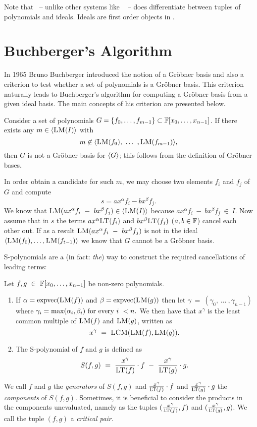 Note that \Sage\ -- unlike other systems like \Singular~\cite{singular} -- does differentiate between tuples of polynomials and ideals. Ideals are first order objects in \Sage.

\section{Buchberger's Algorithm}
In 1965 Bruno Buchberger introduced the notion of a Gröbner basis and also a criterion to test whether a set of polynomials is a Gröbner basis. This criterion naturally leads to Buchberger's algorithm for computing a Gröbner basis from a given ideal basis. The main concepts of his criterion are
presented below.

Consider a set of polynomials $G = \{f_0,\dots,f_{m-1}\} \subset \mathbb{F}[x_0,\dots,x_{n-1}]$. If there exists any $m \in \langle \textsc{LM}(I) \rangle$ with $$m \not\in \langle \textsc{LM}(f_0),\ \dots\ ,\textsc{LM}(f_{m-1})\rangle,$$ then $G$ is not a Gröbner basis for $\langle {G} \rangle$; this follows from the definition of Gröbner bases. 

In order obtain a candidate for such $m$, we may choose two elements $f_i$ and $f_j$ of $G$ and compute \[s = ax^\alpha f_i - bx^\beta f_j.\]
We know that $\textsc{LM}(ax^\alpha f_i\ -\ bx^\beta f_j) \in \langle\textsc{LM}(I)\rangle$ because $ax^\alpha f_i\ -\ bx^\beta f_j\ \in\ I$. Now assume that in $s$ the terms $ax^\alpha\textsc{LT}(f_i)$ and $bx^\beta\textsc{LT}(f_j)$ ($a,b \in \mathbb{F}$) cancel each other out. If as a result $\textsc{LM}(ax^\alpha f_i\ -\ bx^\beta f_j)$ is not in the ideal $\langle\textsc{LM}(f_0), \dots ,\textsc{LM}(f_{t-1})\rangle$ we know that $G$ cannot be a Gröbner basis. 


S-polynomials are a (in fact: \emph{the}) way to construct the required cancellations of leading terms:

\begin{definition}[S-Polynomial]
\hfill\par
\label{def:spolynomials}
Let $f,g\ \in\ \mathbb{F}[x_0,\dots,x_{n-1}]$ be non-zero polynomials.
\begin{enumerate}
\item If $\alpha =\textnormal{expvec}(\textsc{LM}(f))$ and $\beta = \textnormal{expvec}(\textsc{LM}(g))$ then let $\gamma\ =\ (\gamma_0,\ \dots\ ,\gamma_{n-1})$ where 
$\gamma_i = \max(\alpha_i,\beta_i) \textnormal{ for every } i\ < n.$ We then have that $x^\gamma$ is the least common multiple of
$\textsc{LM}(f)$ and $\textsc{LM}(g)$, written as $$x^\gamma\ =\ \LCM(\LM(f),\LM(g)).$$  
\item The S-polynomial of $f$ and $g$ is defined as
\begin{align*}
S(f,g)\ =\ \frac{x^\gamma}{\textsc{LT}(f)}\cdot f\ -\
\frac{x^\gamma}{\textsc{LT}(g)}\cdot g.
\end{align*}
\end{enumerate}
We call $f$ and $g$ the \emph{generators} of $S(f,g)$ and $\frac{x^\gamma}{\textsc{LT}(f)}\cdot f$  and $\frac{x^\gamma}{\textsc{LT}(g)}\cdot g$ the \emph{components} of $S(f,g)$. Sometimes, it is beneficial to consider the products in the components unevaluated, namely as the tuples
$(\frac{x^\gamma}{\textsc{LT}(f)}, f)$ and $(\frac{x^\gamma}{\textsc{LT}(g)}, g)$. We call the tuple $(f,g)$ a \emph{critical pair}.
\end{definition}

